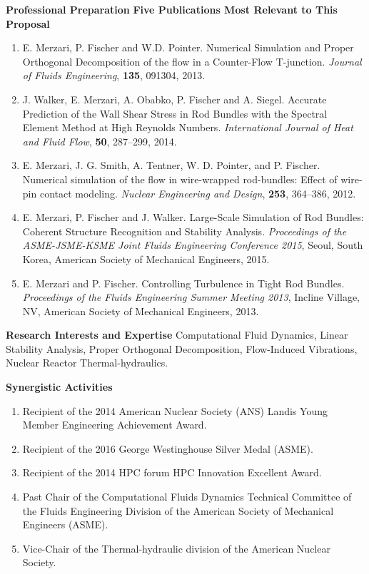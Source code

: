 \documentclass[11pt,letterpaper,english]{article}
\begin{document}
\begin{flushleft} {\bf Professional Preparation}
\vspace{.04in}
{\bf Five Publications Most Relevant to This Proposal}
\vspace{-6pt}
\begin{enumerate} \itemsep1pt \parskip0pt 
\item E. Merzari, P. Fischer and W.D. Pointer. Numerical Simulation and Proper
  Orthogonal Decomposition of the flow in a Counter-Flow
  T-junction. \textit{Journal of Fluids Engineering}, {\bf 135}, 091304, 2013.
\item J. Walker, E. Merzari, A. Obabko, P. Fischer and A. Siegel. Accurate Prediction of the Wall Shear Stress in Rod Bundles with the Spectral Element Method at High Reynolds Numbers. \textit{International Journal of Heat and Fluid Flow}, {\bf 50}, 287--299, 2014.
\item E. Merzari, J. G. Smith, A. Tentner, W. D. Pointer, and P. Fischer. Numerical simulation of the flow in wire-wrapped rod-bundles: Effect of wire-pin contact modeling. \textit{Nuclear Engineering and Design}, {\bf 253}, 364--386, 2012.
\item E. Merzari, P. Fischer and  J. Walker. Large-Scale Simulation of Rod Bundles: Coherent Structure Recognition and Stability Analysis. \textit{Proceedings of the ASME-JSME-KSME Joint Fluids Engineering Conference 2015}, Seoul, South Korea, American Society of Mechanical Engineers, 2015.
\item E. Merzari and P. Fischer. Controlling Turbulence in Tight Rod Bundles. \textit{Proceedings of the Fluids Engineering Summer Meeting 2013}, Incline Village, NV, American Society of Mechanical Engineers, 2013.
\end{enumerate}

\vspace{-6pt}
{\bf Research Interests and Expertise}
{\parindent 16pt
Computational Fluid Dynamics, Linear Stability Analysis, Proper Orthogonal Decomposition, Flow-Induced Vibrations, Nuclear Reactor Thermal-hydraulics.
}

\vspace{.04in}
{\bf Synergistic Activities}
\vspace{-6pt}
\begin{enumerate} \itemsep1pt \parskip0pt 
\item Recipient of the 2014 American Nuclear Society (ANS) Landis Young Member Engineering Achievement Award.
\item Recipient of the 2016 George Westinghouse Silver Medal (ASME).
\item Recipient of the 2014 HPC forum HPC Innovation Excellent Award.
\item Past Chair of the Computational Fluids Dynamics Technical Committee of the Fluids Engineering Division of the American Society of Mechanical Engineers (ASME).
\item Vice-Chair of the Thermal-hydraulic division of the American Nuclear Society.
\end{enumerate}


\end{flushleft}
\end{document}
